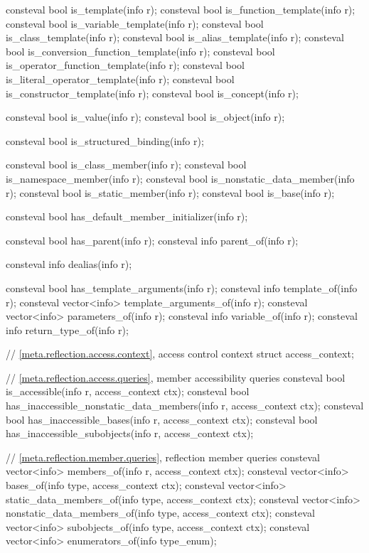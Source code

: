 \begin{codeblock}
{  consteval bool is_template(info r);
  consteval bool is_function_template(info r);
  consteval bool is_variable_template(info r);
  consteval bool is_class_template(info r);
  consteval bool is_alias_template(info r);
  consteval bool is_conversion_function_template(info r);
  consteval bool is_operator_function_template(info r);
  consteval bool is_literal_operator_template(info r);
  consteval bool is_constructor_template(info r);
  consteval bool is_concept(info r);

  consteval bool is_value(info r);
  consteval bool is_object(info r);

  consteval bool is_structured_binding(info r);

  consteval bool is_class_member(info r);
  consteval bool is_namespace_member(info r);
  consteval bool is_nonstatic_data_member(info r);
  consteval bool is_static_member(info r);
  consteval bool is_base(info r);

  consteval bool has_default_member_initializer(info r);

  consteval bool has_parent(info r);
  consteval info parent_of(info r);

  consteval info dealias(info r);

  consteval bool has_template_arguments(info r);
  consteval info template_of(info r);
  consteval vector<info> template_arguments_of(info r);
  consteval vector<info> parameters_of(info r);
  consteval info variable_of(info r);
  consteval info return_type_of(info r);

  // \ref{meta.reflection.access.context}, access control context
  struct access_context;

  // \ref{meta.reflection.access.queries}, member accessibility queries
  consteval bool is_accessible(info r, access_context ctx);
  consteval bool has_inaccessible_nonstatic_data_members(info r, access_context ctx);
  consteval bool has_inaccessible_bases(info r, access_context ctx);
  consteval bool has_inaccessible_subobjects(info r, access_context ctx);

  // \ref{meta.reflection.member.queries}, reflection member queries
  consteval vector<info> members_of(info r, access_context ctx);
  consteval vector<info> bases_of(info type, access_context ctx);
  consteval vector<info> static_data_members_of(info type, access_context ctx);
  consteval vector<info> nonstatic_data_members_of(info type, access_context ctx);
  consteval vector<info> subobjects_of(info type, access_context ctx);
  consteval vector<info> enumerators_of(info type_enum);

}
\end{codeblock}
